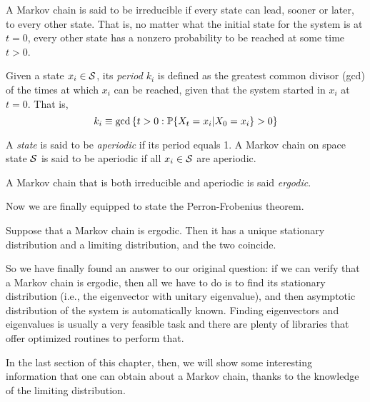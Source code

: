 \begin{ndef} 
    A Markov chain is said to be irreducible if every state can lead, sooner or later, to every other state. That is, no matter what the initial state for the system is at $t=0$, every other state has a nonzero probability to be reached at some time $t>0$.
\end{ndef}
\begin{ndef} 
    Given a state $x_i \in \mathcal{S}$, its \emph{period} $k_i$ is defined as the greatest common divisor (gcd) of the times at which $x_i$ can be reached, given that the system started in $x_i$ at $t=0$. That is,
    \begin{equation}
        k_i \equiv \text{gcd} \left\{ t>0 : \mathbb{P}\{X_t = x_i | X_0 = x_i\} > 0 \right\}
    \end{equation}
    
\end{ndef}
\begin{ndef} [Aperiodicity]
    A \emph{state} is said to be \emph{aperiodic} if its period equals 1. A Markov chain on space state $\mathcal{S}$ is said to be aperiodic if all $x_i \in \mathcal{S}$ are aperiodic. 
\end{ndef}
\begin{ndef} [Ergodicity]
    A Markov chain that is both irreducible and aperiodic is said \emph{ergodic}.
\end{ndef}
Now we are finally equipped to state the Perron-Frobenius theorem.

\begin{theorem}
    Suppose that a Markov chain is ergodic. Then it has a unique stationary distribution and a limiting distribution, and the two coincide.
\end{theorem}

\medskip
So we have finally found an answer to our original question: if we can verify that a Markov chain is ergodic, then all we have to do is to find its stationary distribution (i.e., the eigenvector with unitary eigenvalue), and then asymptotic distribution of the system is automatically known. Finding eigenvectors and eigenvalues is usually a very feasible task and there are plenty of libraries that offer optimized routines to perform that.

In the last section of this chapter, then, we will show some interesting information that one can obtain about a Markov chain, thanks to the knowledge of the limiting distribution.

